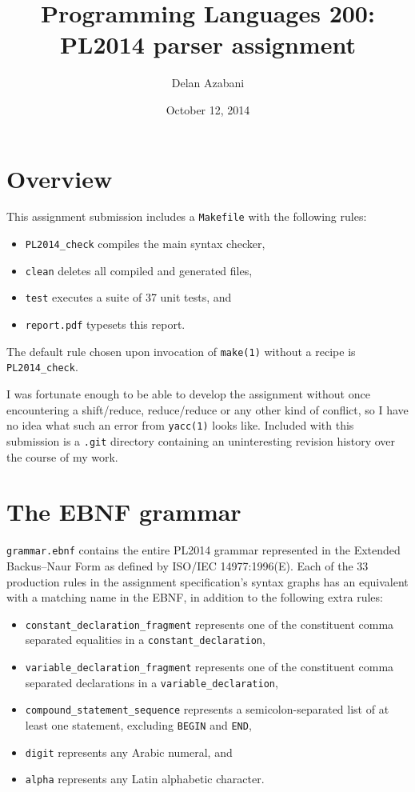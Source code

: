 \documentclass[a4paper,titlepage,12pt]{article}
\title{Programming Languages 200:\\PL2014 parser assignment}
\date{October 12, 2014}
\author{Delan Azabani}
\begin{document}
\maketitle


\section{Overview}

This assignment submission includes a \texttt{Makefile} with the
following rules:

\begin{itemize}
	\item\texttt{PL2014\_check} compiles the main syntax checker,
	\item\texttt{clean} deletes all compiled and generated files,
	\item\texttt{test} executes a suite of 37 unit tests, and
	\item\texttt{report.pdf} typesets this report.
\end{itemize}

The default rule chosen upon invocation of \texttt{make(1)} without a
recipe is \texttt{PL2014\_check}.

I was fortunate enough to be able to develop the assignment without
once encountering a shift/reduce, reduce/reduce or any other kind of
conflict, so I have no idea what such an error from \texttt{yacc(1)}
looks like. Included with this submission is a \texttt{.git} directory
containing an uninteresting revision history over the course of my
work.

\section{The EBNF grammar}

\texttt{grammar.ebnf} contains the entire PL2014 grammar represented in
the Extended Backus--Naur Form as defined by ISO/IEC 14977:1996(E).
Each of the 33 production rules in the assignment specification's
syntax graphs has an equivalent with a matching name in the EBNF, in
addition to the following extra rules:

\begin{itemize}
	\item\texttt{constant\_declaration\_fragment} represents one of
	     the constituent comma separated equalities in a
	     \texttt{constant\_declaration},
	\item\texttt{variable\_declaration\_fragment} represents one of
	     the constituent comma separated declarations in a
	     \texttt{variable\_declaration},
	\item\texttt{compound\_statement\_sequence} represents a
	     semicolon-separated list of at least one statement,
	     excluding \texttt{BEGIN} and \texttt{END},
	\item\texttt{digit} represents any Arabic numeral, and
	\item\texttt{alpha} represents any Latin alphabetic character.
\end{itemize}
\end{document}

